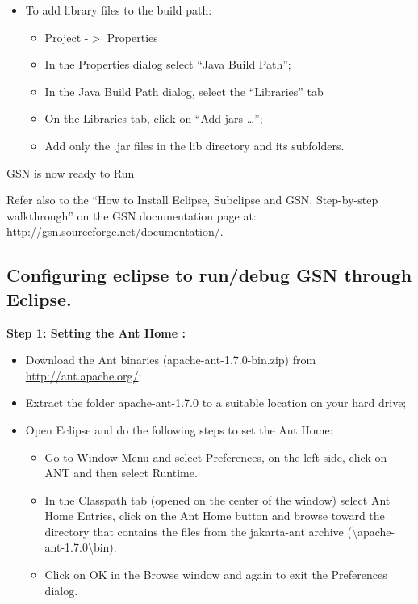 \begin{itemize}
	\item To add library files to the build path:
\begin{itemize}
	\item Project -\begin{math}>\end{math} Properties
	\item In the Properties dialog select \textquotedblleft{}Java Build
Path\textquotedblright{};
	\item In the Java Build Path dialog, select the
\textquotedblleft{}Libraries\textquotedblright{} tab
	\item On the Libraries tab, click on \textquotedblleft{}Add jars
\ldots{}\textquotedblright{};
	\item Add only the .jar files in the lib directory and its subfolders.
\end{itemize}

\end{itemize}

GSN is now ready to Run

Refer also to the \textquotedblleft{}How to Install Eclipse, Subclipse
and GSN, Step-by-step walkthrough\textquotedblright{} on the GSN
documentation page at: http://gsn.sourceforge.net/documentation/.

\subsection{Configuring eclipse to run/debug GSN through Eclipse.}

\textbf{Step 1: Setting the Ant Home :}

\begin{itemize}
	\item Download the Ant binaries (apache-ant-1.7.0-bin.zip) from
\url{http://ant.apache.org/};
	\item Extract the folder apache-ant-1.7.0 to a suitable location on your
hard drive;
	\item Open Eclipse and do the following steps to set the Ant Home:
\begin{itemize}
	\item Go to Window Menu and select Preferences, on the left side, click on
ANT and then select Runtime.
	\item In the Classpath tab (opened on the center of the window) select Ant
Home Entries, click on the Ant Home button and browse toward the
directory that contains the files from the jakarta-ant archive
(\textbackslash apache-ant-1.7.0\textbackslash bin).
	\item Click on OK in the Browse window and again to exit the Preferences
dialog.
\end{itemize}

\end{itemize}

